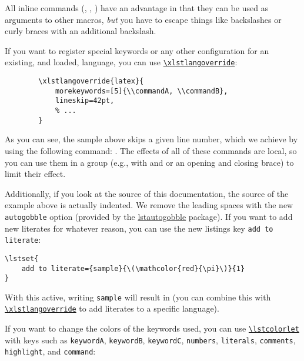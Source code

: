 \documentclass[10pt,DIV=12]{scrartcl}
\let\T\texttt
\def\cmdref#1{\hyperref[arg:#1]{\T{\xlstGetStyle{command}\textbackslash #1}}}
\begin{document}
All inline commands (, , ) have an advantage in that they can be used as arguments to other macros, \textit{but} you have to escape things like backslashes or curly braces with an additional backslash.

If you want to register special keywords or any other configuration for an existing, and loaded, language, you can use \cmdref{xlstlangoverride}:

\begingroup
{}
\begin{verbatim}
        \xlstlangoverride{latex}{
            morekeywords=[5]{\\commandA, \\commandB},
            lineskip=42pt,
            % ...
        }
\end{verbatim}
\endgroup

As you can see, the sample above skips a given line number, which we achieve by using the following command: .
The effects of all of these commands are local, so you can use them in a group (e.g., with \blatex{\\begingroup} and \blatex{\\endgroup} or an opening and closing brace) to limit their effect.

Additionally, if you look at the source of this documentation, the source of the example above is actually indented. We remove the leading spaces with the new \T{autogobble} option (provided by the \href{https://ctan.org/pkg/lstautogobble}{lstautogobble} package).
If you want to add new literates for whatever reason, you can use the new listings key \T{add to literate}:

\begin{verbatim}
\lstset{
    add to literate={sample}{\(\mathcolor{red}{\pi}\)}{1}
}
\end{verbatim}

\begingroup
{}

With this active, writing \T{sample} will result in  (you can combine this with \cmdref{xlstlangoverride} to add literates to a specific language).
\endgroup

If you want to change the colors of the keywords used, you can use \cmdref{lstcolorlet} with keys such as \T{keywordA}, \T{keywordB}, \T{keywordC}, \T{numbers}, \T{literals}, \T{comments}, \T{highlight}, and \T{command}:
\end{document}
